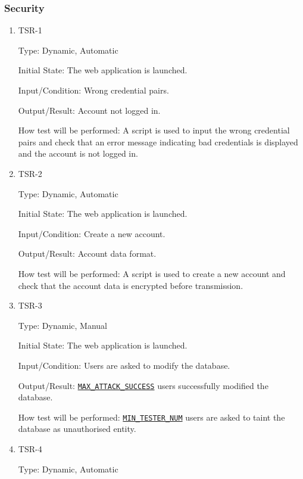 \documentclass[12pt, titlepage]{article}
\begin{document}
\subsubsection{Security}

\begin{enumerate}
\item{TSR-1\\}\label{TSR-1}

Type: Dynamic, Automatic
					
Initial State: The web application is launched.
					
Input/Condition: Wrong credential pairs.
					
Output/Result: Account not logged in.
					
How test will be performed: A script is used to input the wrong credential pairs and check that an error message indicating bad credentials is displayed and the account is not logged in.

\item{TSR-2\\}\label{TSR-2}

Type: Dynamic, Automatic
					
Initial State: The web application is launched.
					
Input/Condition: Create a new account.
					
Output/Result: Account data format.
					
How test will be performed: A script is used to create a new account and check that the account data is encrypted before transmission.

\item{TSR-3\\}\label{TSR-3}

Type: Dynamic, Manual
					
Initial State: The web application is launched.
					
Input/Condition: Users are asked to modify the database.
					
Output/Result: \hyperref[MAX_ATTACK_SUCCESS]{\texttt{MAX\_ATTACK\_SUCCESS}} users successfully modified the database.
					
How test will be performed: \hyperref[MIN_TESTER_NUM]{\texttt{MIN\_TESTER\_NUM}} users are asked to taint the database as unauthorised entity.

\item{TSR-4\\}\label{TSR-4}

Type: Dynamic, Automatic
					

\end{enumerate}
\end{document}
